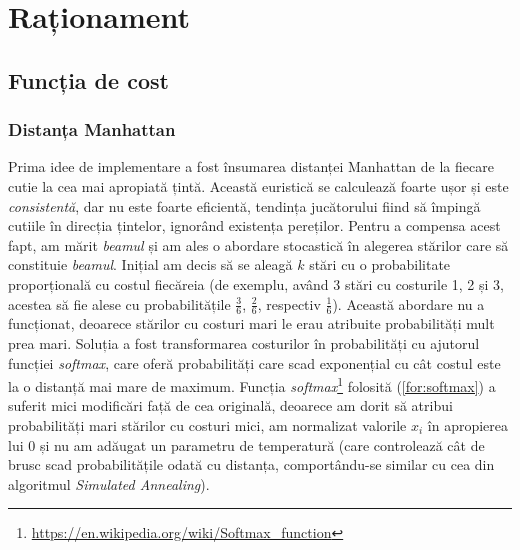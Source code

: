 \documentclass{article}
\begin{document}
\section{Raționament}

\subsection{Funcția de cost}

\subsubsection{Distanța Manhattan}
Prima idee de implementare a fost însumarea distanței Manhattan de la fiecare
cutie la cea mai apropiată țintă. Această euristică se calculează foarte ușor și
este \textit{consistentă}, dar nu este foarte eficientă, tendința jucătorului 
fiind să împingă cutiile în direcția țintelor, ignorând existența pereților. 
Pentru a compensa acest fapt, am mărit \textit{beamul} și am ales o abordare
stocastică în alegerea stărilor care să constituie \textit{beamul}. Inițial am
decis să se aleagă $k$ stări cu o probabilitate proporțională cu costul 
fiecăreia (de exemplu, având 3 stări cu costurile 1, 2 și 3, acestea să fie 
alese cu probabilitățile $\frac{3}{6}$, $\frac{2}{6}$, respectiv $\frac{1}{6}$).
Această abordare nu a funcționat, deoarece stărilor cu costuri mari le erau 
atribuite probabilități mult prea mari. Soluția a fost transformarea costurilor
în probabilități cu ajutorul funcției \textit{softmax}, care oferă probabilități
care scad exponențial cu cât costul este la o distanță mai mare de maximum.
Funcția 
\textit{softmax}\footnote{\url{https://en.wikipedia.org/wiki/Softmax_function}}
folosită (\ref{for:softmax}) a suferit mici modificări față de cea originală, 
deoarece am dorit să atribui probabilități mari stărilor cu costuri mici, am 
normalizat valorile $x_i$ în apropierea lui 0 și nu am adăugat un parametru de 
temperatură (care controlează cât de brusc scad probabilitățile odată cu 
distanța, comportându-se similar cu cea din algoritmul \textit{Simulated 
Annealing}).
\end{document}
